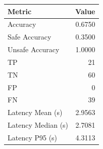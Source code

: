 \begin{table}[ht]
\centering
\begin{tabular}{lr}
\toprule
Metric & Value \\
\midrule
Accuracy & 0.6750 \\
Safe Accuracy & 0.3500 \\
Unsafe Accuracy & 1.0000 \\
TP & 21 \\
TN & 60 \\
FP & 0 \\
FN & 39 \\
Latency Mean (s) & 2.9563 \\
Latency Median (s) & 2.7081 \\
Latency P95 (s) & 4.3113 \\
\bottomrule
\end{tabular}
\end{table}